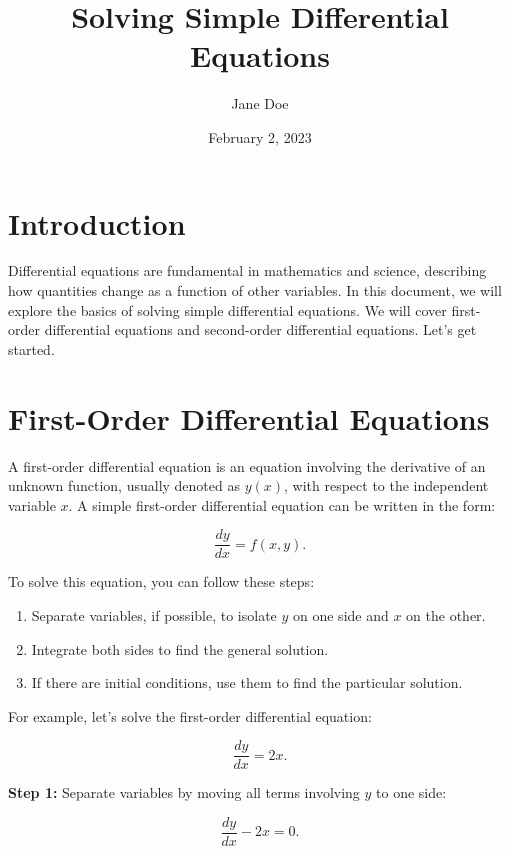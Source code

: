 \documentclass{article}
\title{Solving Simple Differential Equations}
\author{Jane Doe}
\date{February 2, 2023}
\begin{document}
\maketitle

\section{Introduction}

Differential equations are fundamental in mathematics and science, describing how quantities change as a function of other variables. In this document, we will explore the basics of solving simple differential equations. We will cover first-order differential equations and second-order differential equations. Let's get started.

\section{First-Order Differential Equations}

A first-order differential equation is an equation involving the derivative of an unknown function, usually denoted as $y(x)$, with respect to the independent variable $x$. A simple first-order differential equation can be written in the form:

\begin{equation}
\frac{dy}{dx} = f(x, y).
\end{equation}

To solve this equation, you can follow these steps:

\begin{enumerate}
  \item Separate variables, if possible, to isolate $y$ on one side and $x$ on the other.
  \item Integrate both sides to find the general solution.
  \item If there are initial conditions, use them to find the particular solution.
\end{enumerate}

For example, let's solve the first-order differential equation:

\begin{equation}
\frac{dy}{dx} = 2x.
\end{equation}

\textbf{Step 1:} Separate variables by moving all terms involving $y$ to one side:

\begin{equation}
\frac{dy}{dx} - 2x = 0.
\end{equation}
\end{document}
